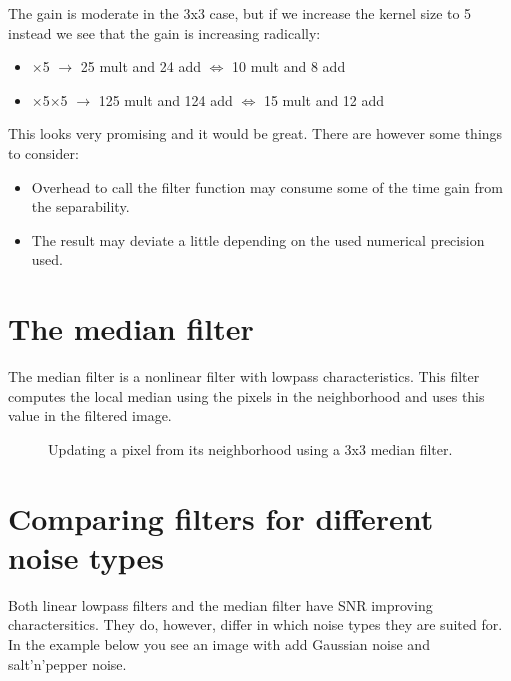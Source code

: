 \documentclass[letterpaper,10pt,english]{sphinxmanual}
\begin{document}
\sphinxAtStartPar
The gain is moderate in the 3x3 case, but if we increase the kernel size to 5 instead we see that the gain is increasing radically:
\begin{itemize}
\item {} 
\(\times\)5 \(\rightarrow\) 25 mult and 24 add \(\Leftrightarrow\) 10 mult and 8 add

\item {} 
\(\times\)5\(\times\)5 \(\rightarrow\) 125 mult and 124 add \(\Leftrightarrow\) 15 mult and 12 add

\end{itemize}

\sphinxAtStartPar
This looks very promising and it would be great. There are however some things to consider:
\begin{itemize}
\item {} 
\sphinxAtStartPar
Overhead to call the filter function may consume some of the time gain from the separability.

\item {} 
\sphinxAtStartPar
The result may deviate a little depending on the used numerical precision used.

\end{itemize}


\section{The median filter}
\label{\detokenize{02-ImageEnhancement:the-median-filter}}
\sphinxAtStartPar
The median filter is a non\sphinxhyphen{}linear filter with low\sphinxhyphen{}pass characteristics. This filter computes the local median using the pixels in the neighborhood and uses this value in the filtered image.

\begin{figure}[htbp]
\centering
\capstart

\noindent{}
\caption{Updating a pixel from its neighborhood using a 3x3 median filter.}\label{\detokenize{02-ImageEnhancement:id10}}\end{figure}




\section{Comparing filters for different noise types}
\label{\detokenize{02-ImageEnhancement:comparing-filters-for-different-noise-types}}
\sphinxAtStartPar
Both linear low\sphinxhyphen{}pass filters and the median filter have SNR improving charactersitics. They do, however, differ in which noise types they are suited for. In the example below you see an image with add Gaussian noise and salt’n’pepper noise.
\end{document}
